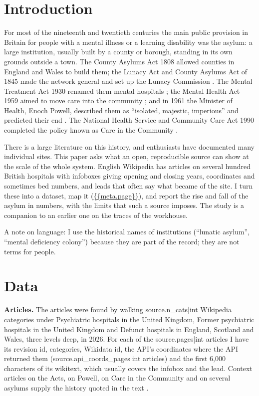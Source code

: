 \documentclass[11pt,a4paper]{article}
\begin{document}
\section{Introduction}
For most of the nineteenth and twentieth centuries the main public provision in Britain for people with a mental illness or a learning disability was the asylum: a large institution, usually built by a county or borough, standing in its own grounds outside a town. The County Asylums Act 1808 allowed counties in England and Wales to build them; the Lunacy Act and County Asylums Act of 1845 made the network general and set up the Lunacy Commission \citep{wiki1808,wiki1845}. The Mental Treatment Act 1930 renamed them mental hospitals \citep{wiki1930}; the Mental Health Act 1959 aimed to move care into the community \citep{wiki1959}; and in 1961 the Minister of Health, Enoch Powell, described them as ``isolated, majestic, imperious'' and predicted their end \citep{wikipowell}. The National Health Service and Community Care Act 1990 completed the policy known as Care in the Community \citep{wikicc}.

There is a large literature on this history, and enthusiasts have documented many individual sites. This paper asks what an open, reproducible source can show at the scale of the whole system. English Wikipedia has articles on several hundred British hospitals with infoboxes giving opening and closing years, coordinates and sometimes bed numbers, and leads that often say what became of the site. I turn these into a dataset, map it (\url{{{meta.page}}}), and report the rise and fall of the asylum in numbers, with the limits that such a source imposes. The study is a companion to an earlier one on the traces of the workhouse.

A note on language: I use the historical names of institutions (``lunatic asylum'', ``mental deficiency colony'') because they are part of the record; they are not terms for people.

\section{Data}
\textbf{Articles.} The articles were found by walking {{source.n_cats|int}} Wikipedia categories under Psychiatric hospitals in the United Kingdom, Former psychiatric hospitals in the United Kingdom and Defunct hospitals in England, Scotland and Wales, three levels deep, in 2026. For each of the {{source.pages|int}} articles I have its revision id, categories, Wikidata id, the API's coordinates where the API returned them ({{source.api_coords_pages|int}} articles) and the first 6,000 characters of its wikitext, which usually covers the infobox and the lead. Context articles on the Acts, on Powell, on Care in the Community and on several asylums supply the history quoted in the text \citep{wiki1774,wiki1808,wiki1845,wiki1930,wiki1959,wikipowell,wikicc,wikiepsom,wikiwhit,wikicolney,wikibethlem,wikila}.
\end{document}
